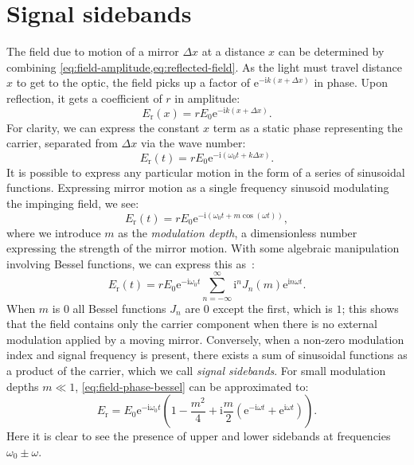 \section{\label{sec:signal-sidebands}Signal sidebands}
The field due to motion of a mirror $\Delta x$ at a distance $x$ can be determined by combining \cref{eq:field-amplitude,eq:reflected-field}. As the light must travel distance $x$ to get to the optic, the field picks up a factor of $\text{e}^{-\text{i}k \left( x + \Delta x \right)}$ in phase. Upon reflection, it gets a coefficient of $r$ in amplitude:
\begin{equation}
  E_{\text{r}} \left( x \right) = r E_0 \text{e}^{-\text{i} k \left( x + \Delta x \right)}.
\end{equation}
For clarity, we can express the constant $x$ term as a static phase representing the carrier, separated from $\Delta x$ via the wave number:
\begin{equation}
  \label{eq:field-amplitude-phase}
  E_{\text{r}} \left( t \right) = r E_0 \text{e}^{-\text{i} \left( \omega_0 t + k \Delta x\right)}.
\end{equation}
It is possible to express any particular motion in the form of a series of sinusoidal functions. Expressing mirror motion as a single frequency sinusoid modulating the impinging field, we see:
\begin{equation}
  \label{eq:field-phase-modulation}
  E_{\text{r}} \left( t \right) = r E_0 \text{e}^{-\text{i} \left(\omega_0 t + m \cos{\left( \omega t \right)} \right)},
\end{equation}
where we introduce $m$ as the \emph{modulation depth}, a dimensionless number expressing the strength of the mirror motion. With some algebraic manipulation involving Bessel functions, we can express this as~\cite{Freise2010}:
\begin{equation}
  \label{eq:field-phase-bessel}
  E_{\text{r}} \left( t \right) = r E_0 \text{e}^{-\text{i} \omega_0 t} \sum^{\infty}_{n=-\infty} \text{i}^n J_{n} \left( m \right) \text{e}^{\text{i} n \omega t}.
\end{equation}
When $m$ is $0$ all Bessel functions $J_{n}$ are $0$ except the first, which is $1$; this shows that the field contains only the carrier component when there is no external modulation applied by a moving mirror. Conversely, when a non-zero modulation index and signal frequency is present, there exists a sum of sinusoidal functions as a product of the carrier, which we call \emph{signal sidebands}. For small modulation depths $m \ll 1$, \cref{eq:field-phase-bessel} can be approximated to:
\begin{equation}
  \label{eq:field-phase-mod-expanded}
  E_{\text{r}} = E_0 \text{e}^{-\text{i} \omega_0 t} \left( 1 - \frac{m^2}{4} + \text{i} \frac{m}{2} \left( \text{e}^{-\text{i} \omega t} + \text{e}^{\text{i} \omega t} \right) \right).
\end{equation}
Here it is clear to see the presence of upper and lower sidebands at frequencies $\omega_0 \pm \omega$.

